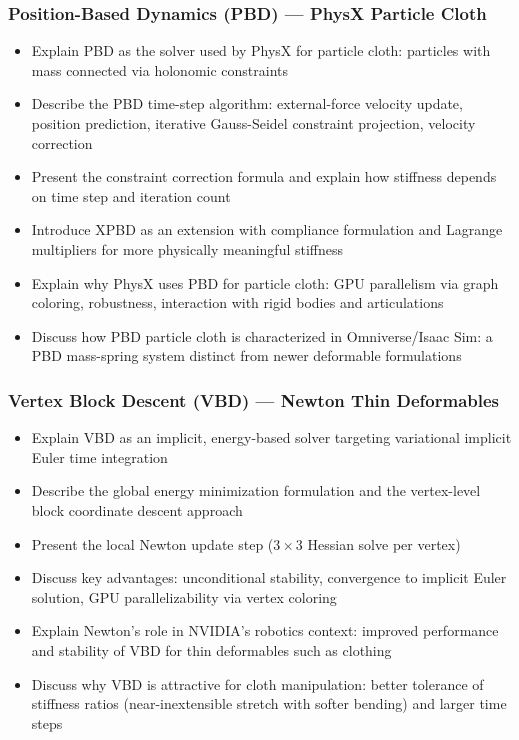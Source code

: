\subsubsection{Position-Based Dynamics (PBD) --- PhysX Particle Cloth}
\begin{itemize}
    \item Explain PBD as the solver used by PhysX for particle cloth: particles with mass connected via holonomic constraints
    \item Describe the PBD time-step algorithm: external-force velocity update, position prediction, iterative Gauss-Seidel constraint projection, velocity correction
    \item Present the constraint correction formula and explain how stiffness depends on time step and iteration count
    \item Introduce XPBD as an extension with compliance formulation and Lagrange multipliers for more physically meaningful stiffness
    \item Explain why PhysX uses PBD for particle cloth: GPU parallelism via graph coloring, robustness, interaction with rigid bodies and articulations
    \item Discuss how PBD particle cloth is characterized in Omniverse/Isaac Sim: a PBD mass-spring system distinct from newer deformable formulations
\end{itemize}

\subsubsection{Vertex Block Descent (VBD) --- Newton Thin Deformables}
\begin{itemize}
    \item Explain VBD as an implicit, energy-based solver targeting variational implicit Euler time integration
    \item Describe the global energy minimization formulation and the vertex-level block coordinate descent approach
    \item Present the local Newton update step ($3 \times 3$ Hessian solve per vertex)
    \item Discuss key advantages: unconditional stability, convergence to implicit Euler solution, GPU parallelizability via vertex coloring
    \item Explain Newton's role in NVIDIA's robotics context: improved performance and stability of VBD for thin deformables such as clothing
    \item Discuss why VBD is attractive for cloth manipulation: better tolerance of stiffness ratios (near-inextensible stretch with softer bending) and larger time steps
\end{itemize}

